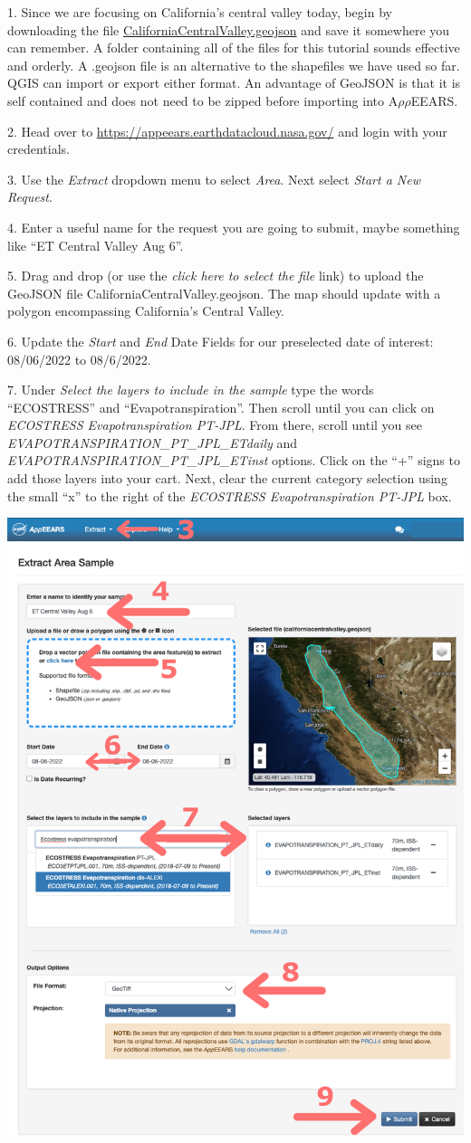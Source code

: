 \documentclass[oneside,a4paper,11pt,explicit]{book}
\begin{document}
1. Since we are focusing on California's central valley today, begin by downloading the file \href{https://jeremydforsythe.github.io/icecream-tutorials/Tutorial6_Evaportranspiration1/CaliforniaCentralValley.geojson}{CaliforniaCentralValley.geojson} and save it somewhere you can remember. A folder containing all of the files for this tutorial sounds effective and orderly. A .geojson file is an alternative to the shapefiles we have used so far. QGIS can import or export either format. An advantage of GeoJSON is that it is self contained and does not need to be zipped before importing into A$\rho\rho$EEARS.

2. Head over to \href{https://appeears.earthdatacloud.nasa.gov/}{https://appeears.earthdatacloud.nasa.gov/} and login with your credentials. 

3. Use the \textit{Extract} dropdown menu to select \textit{Area}. Next select \textit{Start a New Request}. 

4. Enter a useful name for the request you are going to submit, maybe something like ``ET Central Valley Aug 6''. 

5. Drag and drop (or use the \textit{click here to select the file} link) to upload the GeoJSON file CaliforniaCentralValley.geojson. The map should update with a polygon encompassing California's Central Valley.

6. Update the \textit{Start} and \textit{End} Date Fields for our preselected date of interest: 08/06/2022 to 08/6/2022.

7. Under \textit{Select the layers to include in the sample} type the words ``ECOSTRESS'' and ``Evapotranspiration''. Then scroll until you can click on \textit{ECOSTRESS Evapotranspiration PT-JPL}. From there, scroll until you see \textit{EVAPOTRANSPIRATION\_PT\_JPL\_ETdaily} and \textit{EVAPOTRANSPIRATION\_PT\_JPL\_ETinst} options. Click on the ``+'' signs to add those layers into your cart. Next, clear the current category selection using the small ``x'' to the right of the \textit{ECOSTRESS Evapotranspiration PT-JPL} box.

\centerline{\includegraphics[width=.6\textwidth]{ETRequest.png}}
\end{document}

